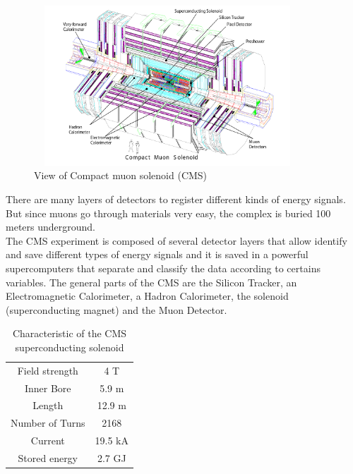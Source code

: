 \begin{figure}[!htbp]
	\centering
	\includegraphics[width=10cm,height=6cm]{Chapter2/cms2.png}
	\caption[View of Compact muon solenoid (CMS)]{View of Compact muon solenoid (CMS)\cite{cms-manual}}\label{cms}
\end{figure}
There are many layers of detectors to register different kinds of energy signals. But since muons go through materials very easy, the complex is buried 100 meters underground.\\ 

The CMS experiment is composed of several detector layers that allow identify and save different types of energy signals and it is saved in a powerful supercomputers that separate and classify the data according to certains variables. The general parts of the CMS are the Silicon Tracker, an Electromagnetic Calorimeter, a Hadron Calorimeter, the solenoid (superconducting magnet) and the Muon Detector. \\

\begin{table}[ht]
	\caption[Characteristic of the CMS superconducting solenoid]{Characteristic of the CMS superconducting solenoid\cite{cms-manual}}
	\centering
	\begin{tabular}{|c|c|}
		\hline
		Field strength & 4 T \\
		Inner Bore & 5.9 m \\
		Length & 12.9 m\\
		Number of Turns & 2168\\
		Current & 19.5 kA\\
		Stored energy & 2.7 GJ\\
		\hline
	\end{tabular}
	\label{tab:my_label}
\end{table}




